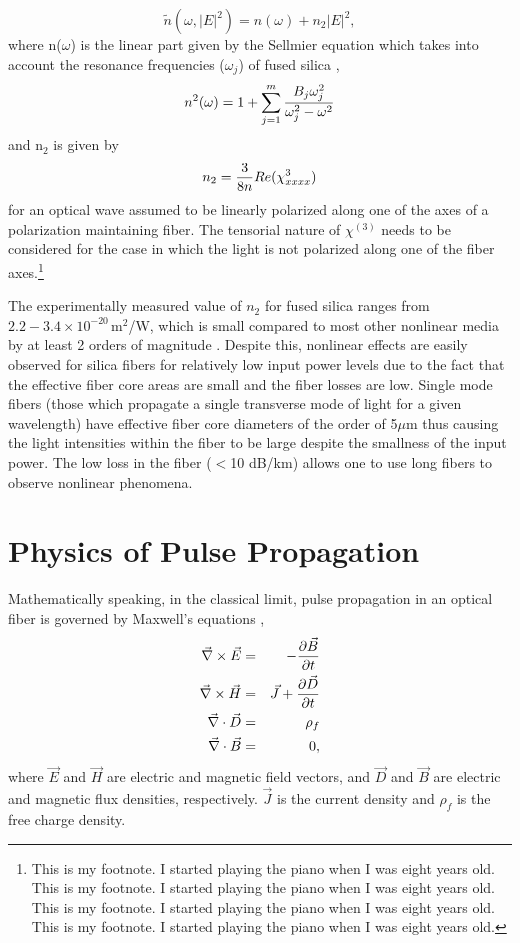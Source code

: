 \begin{equation}
\tilde{n}(\omega,|E|^2) = n(\omega)+n_2|E|^2 ,
\end{equation}
where n($\omega$) is the linear part given by the Sellmier
equation which
takes into account the resonance frequencies ($\omega_j$) of fused
silica \cite{Agrawal1,Marcuse},
\begin{equation}
n^2(\omega) = 1 + \sum_{j=1}^m {B_j\omega^2_j \over \omega^2_j - \omega^2}
\end{equation}
and n$_2$ is given by
\begin{equation}
n_2 = {3 \over 8n}Re(\chi_{xxxx}^3)
\end{equation}
for an optical wave assumed to be linearly polarized along one of the 
axes of a polarization maintaining fiber. The tensorial nature of $\chi^{(3)}$ needs to be
considered for the case in which the light is not polarized along one of
the fiber axes.\footnote{This is my footnote.  I started playing the piano when I was eight years old.  This is my footnote.  I started playing the piano when I was eight years old.  This is my footnote.  I started playing the piano when I was eight years old.  This is my footnote.  I started playing the piano when I was eight years old.}

The experimentally measured value of $n_{2}$ for fused silica ranges from $2.2 - 3.4 \times
10^{-20}$\,m$^2$/W, which is small compared to most other nonlinear media by
at least 2 orders of magnitude \cite{Agrawal1}. Despite this, nonlinear effects are
easily observed for silica fibers for relatively low input power levels due
to the fact that the effective fiber core areas are small and the fiber losses are low. Single mode fibers (those which propagate a single transverse mode of light for a given wavelength) have effective fiber core diameters of the order of 5$\mu$m thus causing the light intensities within the fiber to be large despite the smallness of the input power. The low loss in the fiber ($<$10 dB/km) allows one to use long fibers to observe nonlinear phenomena.

\section{Physics of Pulse Propagation}

Mathematically speaking, in the classical limit, pulse propagation in an
optical fiber is governed by Maxwell's equations \cite{Agrawal2,Diament}, 
\begin{eqnarray} 
\vec{\nabla}\times\vec{E} & = &- {\partial \vec{B} \over \partial t} \nonumber\\
\vec{\nabla}\times\vec{H} & = & \vec{J}+ {\partial \vec{D} \over \partial t}
\nonumber\\ 
\vec{\nabla}\cdot\vec{D} & = & \rho_{f} \nonumber\\
\vec{\nabla}\cdot\vec{B} & = & 0 ,
\end{eqnarray}
where $\vec{E}$ and $\vec{H}$ are electric and magnetic field
vectors, and
$\vec{D}$ and $\vec{B}$ are electric and magnetic flux densities, 
respectively. $\vec{J}$ is the current density and $\rho_{f}$ is the free
charge density.

